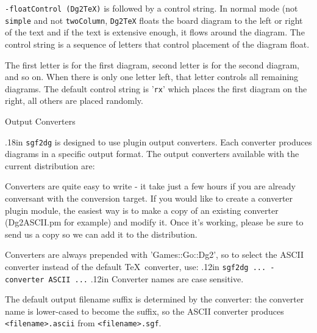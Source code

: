 {\tt -floatControl (Dg2TeX)} is followed by a control string.  In normal
mode (not {\tt simple} and not {\tt twoColumn}, {\tt Dg2TeX} floats the
board diagram to the left or right of the text and if the text is extensive
enough, it flows around the diagram.  The control string is a sequence of
letters that control placement of the diagram float.
\medbreak
\centerline{
\vbox{
}}
\medbreak
The first letter is for the first diagram, second letter is for the second
diagram, and so on. When there is only one letter left, that letter
controls all remaining diagrams.  The default control string is '{\tt rx}'
which places the first diagram on the right, all others are placed
randomly.

\vfil\eject
\centerline{\titlefont Output Converters}
\vglue.18in
{\tt sgf2dg} is designed to use plugin output converters.  Each
converter produces diagrams in a specific output format.  The output
converters available with the current distribution are:

\medbreak
\centerline{
\vbox{
}}
\medbreak

Converters are quite easy to write - it take just a few hours if
you are already conversant with the conversion target.  If you would
like to create a converter plugin module, the easiest way is to make
a copy of an existing converter (Dg2ASCII.pm for example) and
modify it.  Once it's working, please be sure to send us a copy so
we can add it to the distribution.

Converters are always prepended with 'Games::Go::Dg2', so to select
the ASCII converter instead of the default \TeX\ converter, use:
\vglue.12in
    {\tt sgf2dg ... -converter ASCII ...}
\vglue.12in
Converter names are case sensitive.

The default output filename suffix is determined by the converter:
the converter name is lower-cased to become the suffix, so the ASCII
converter produces {\tt <filename>.ascii} from {\tt <filename>.sgf}.

